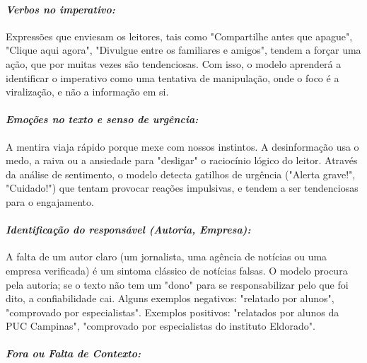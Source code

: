 \documentclass[
  brazilian,
  11pt,
]{article}
\begin{document}
\paragraph{\texorpdfstring{\emph{Verbos no imperativo:}}{Verbos no imperativo:}}\label{verbos-no-imperativo}

Expressões que enviesam os leitores, tais como "Compartilhe antes que apague", "Clique aqui agora", "Divulgue entre os familiares e amigos", tendem a forçar uma ação, que por muitas vezes são tendenciosas. Com isso, o modelo aprenderá a identificar o imperativo como uma tentativa de manipulação, onde o foco é a viralização, e não a informação em si.

\paragraph{\texorpdfstring{\emph{Emoções no texto e senso de urgência:}}{Emoções no texto e senso de urgência:}}\label{emouxe7uxf5es-no-texto-e-senso-de-urguxeancia}

A mentira viaja rápido porque mexe com nossos instintos. A desinformação usa o medo, a raiva ou a ansiedade para "desligar" o raciocínio lógico do leitor. Através da análise de sentimento, o modelo detecta gatilhos de urgência ("Alerta grave!", "Cuidado!") que tentam provocar reações impulsivas, e tendem a ser tendenciosas para o engajamento.

\paragraph{\texorpdfstring{\emph{Identificação do responsável (Autoria, Empresa):}}{Identificação do responsável (Autoria, Empresa):}}\label{identificauxe7uxe3o-do-responsuxe1vel-autoria-empresa}

A falta de um autor claro (um jornalista, uma agência de notícias ou uma empresa verificada) é um sintoma clássico de notícias falsas. O modelo procura pela autoria; se o texto não tem um "dono" para se responsabilizar pelo que foi dito, a confiabilidade cai. Alguns exemplos negativos: "relatado por alunos", "comprovado por especialistas". Exemplos positivos: "relatados por alunos da PUC Campinas", "comprovado por especialistas do instituto Eldorado".

\paragraph{\texorpdfstring{\emph{Fora ou Falta de Contexto:}}{Fora ou Falta de Contexto:}}\label{fora-ou-falta-de-contexto}
\end{document}
